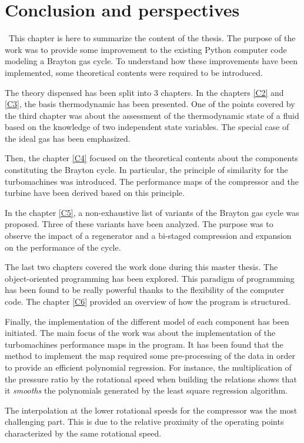 \chapter{Conclusion and perspectives}
\quad\ This chapter is here to summarize the content of the thesis. The purpose of the work was to provide some improvement to the existing Python computer code modeling a Brayton gas cycle. To understand how these improvements have been implemented, some theoretical contents were required to be introduced. 

The theory dispensed has been split into 3 chapters. In the chapters \ref{C2} and \ref{C3}, the basis thermodynamic has been presented. One of the points covered by the third chapter was about the assessment of the thermodynamic state of a fluid based on the knowledge of two independent state variables. The special case of the ideal gas has been emphasized.

Then, the chapter \ref{C4} focused on the theoretical contents about the components constituting the Brayton cycle. In particular, the principle of similarity for the turbomachines was introduced. The performance maps of the compressor and the turbine have been derived based on this principle. 

In the chapter \ref{C5}, a non-exhaustive list of variants of the Brayton gas cycle was proposed. Three of these variants have been analyzed. The purpose was to observe the impact of a regenerator and a bi-staged compression and expansion on the performance of the cycle. 

The last two chapters covered the work done during this master thesis. The object-oriented programming has been explored. This paradigm of programming has been found to be really powerful thanks to the flexibility of the computer code. The chapter \ref{C6} provided an overview of how the program is structured. 

Finally, the implementation of the different model of each component has been initiated. The main focus of the work was about the implementation of the turbomachines performance maps in the program. It has been found that the method to implement the map required some pre-processing of the data in order to provide an efficient polynomial regression. For instance, the multiplication of the pressure ratio by the rotational speed when building the relations shows that it \textit{smooths}
the polynomials generated by the least square regression algorithm.


The interpolation at the lower rotational speeds for the compressor was the most challenging part. This is due to the relative proximity of the operating points characterized by the same rotational speed. 

